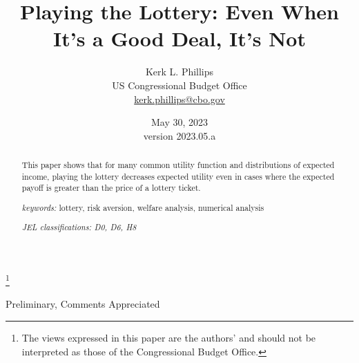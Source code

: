 \documentclass[letterpaper,12pt]{article}
\numberwithin{equation}{section}
\numberwithin{figure}{section}
\numberwithin{table}{section}
\begin{document}
\begin{titlepage}
	\title{Playing the Lottery: Even When It's a Good Deal, It's Not}
    
    \thanks{The views expressed in this paper are the authors' and should not be interpreted as those of the Congressional Budget Office.}

	\author{Kerk L. Phillips \\
	\small US Congressional Budget Office \\
	\small \href{mailto:kerk.phillips@cbo.gov}{kerk.phillips@cbo.gov} }


	\date{May 30, 2023\\
	\small{version 2023.05.a}}

	
	\maketitle

	\vspace{-0.3in}
	\begin{abstract}
	\small{
	This paper shows that for many common utility function and distributions of expected income, playing the lottery decreases expected utility even in cases where the expected payoff is greater than the price of a lottery ticket.

	\vspace{0.1in}

	\textit{keywords:} lottery, risk aversion, welfare analysis, numerical analysis

	\vspace{0.1in}

	\textit{JEL classifications: D0, D6, H8} }
	\end{abstract}

	\centering
	Preliminary, Comments Appreciated

	\thispagestyle{empty}
\end{titlepage}
\end{document}
